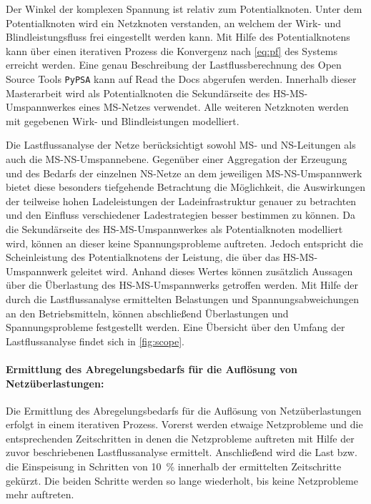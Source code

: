 Der Winkel der komplexen Spannung ist relativ zum Potentialknoten.
Unter dem Potentialknoten wird ein Netzknoten verstanden, an welchem der Wirk- und Blindleistungsfluss frei eingestellt werden kann.
Mit Hilfe des Potentialknotens kann über einen iterativen Prozess die Konvergenz nach \autoref{eq:pf} des Systems erreicht werden.
Eine genau Beschreibung der Lastflussberechnung des Open Source Tools \texttt{PyPSA} kann auf Read the Docs \cite{Brown2020a} abgerufen werden.
Innerhalb dieser Masterarbeit wird als Potentialknoten die Sekundärseite des \gls{HS}-\gls{MS}-Umspannwerkes eines \gls{MS}-Netzes verwendet.
Alle weiteren Netzknoten werden mit gegebenen Wirk- und Blindleistungen modelliert. \cite{Schachler}\medskip

Die Lastflussanalyse der Netze berücksichtigt sowohl \gls{MS}- und \gls{NS}-Leitungen als auch die \gls{MS}-\gls{NS}-Umspannebene.
Gegenüber einer Aggregation der Erzeugung und des Bedarfs der einzelnen \gls{NS}-Netze an dem jeweiligen \gls{MS}-\gls{NS}-Umspannwerk bietet diese besonders tiefgehende Betrachtung die Möglichkeit, die Auswirkungen der teilweise hohen Ladeleistungen der Ladeinfrastruktur genauer zu betrachten und den Einfluss verschiedener Ladestrategien besser bestimmen zu können.
Da die Sekundärseite des \gls{HS}-\gls{MS}-Umspannwerkes als Potentialknoten modelliert wird, können an dieser keine Spannungsprobleme auftreten.
Jedoch entspricht die Scheinleistung des Potentialknotens der Leistung, die über das \gls{HS}-\gls{MS}-Umspannwerk geleitet wird.
Anhand dieses Wertes können zusätzlich Aussagen über die Überlastung des \gls{HS}-\gls{MS}-Umspannwerks getroffen werden.
Mit Hilfe der durch die Lastflussanalyse ermittelten Belastungen und Spannungsabweichungen an den Betriebsmitteln, können abschließend Überlastungen und Spannungsprobleme festgestellt werden.
Eine Übersicht über den Umfang der Lastflussanalyse findet sich in \autoref{fig:scope}. \cite{Schachler}




\paragraph{Ermittlung des Abregelungsbedarfs für die Auflösung von Netzüberlastungen:}

Die Ermittlung des Abregelungsbedarfs für die Auflösung von Netzüberlastungen erfolgt in einem iterativen Prozess.
Vorerst werden etwaige Netzprobleme und die entsprechenden Zeitschritten in denen die Netzprobleme auftreten mit Hilfe der zuvor beschriebenen Lastflussanalyse ermittelt.
Anschließend wird die Last bzw. die Einspeisung in Schritten von \SI{10}{\percent} innerhalb der ermittelten Zeitschritte gekürzt.
Die beiden Schritte werden so lange wiederholt, bis keine Netzprobleme mehr auftreten.\medskip

